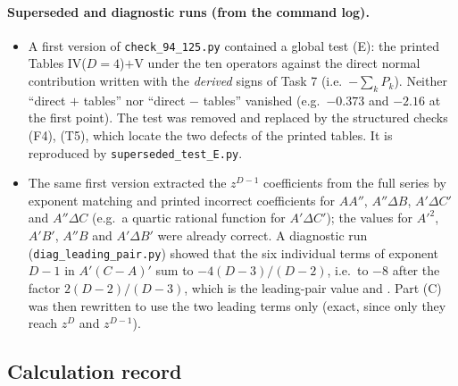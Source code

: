 \paragraph{Superseded and diagnostic runs (from the command log).}
\begin{itemize}[leftmargin=14pt]
\item A first version of \texttt{check\_94\_125.py} contained a global test (E): the printed Tables IV($D=4$)$+$V under the ten operators against the
direct normal contribution written with the \emph{derived} signs of Task 7 (i.e.\ $-\sum_kP_k$). Neither ``direct $+$ tables'' nor
``direct $-$ tables'' vanished (e.g.\ $-0.373$ and $-2.16$ at the first point). The test was removed and replaced by the structured checks (F4), (T5),
which locate the two defects of the printed tables. It is reproduced by \texttt{superseded\_test\_E.py}.
\item The same first version extracted the $z^{D-1}$ coefficients from the full series by exponent matching and printed incorrect coefficients for
$AA''$, $A''\Delta B$, $A'\Delta C'$ and $A''\Delta C$ (e.g.\ a quartic rational function for $A'\Delta C'$); the values for $A'^2$, $A'B'$,
$A''B$ and $A'\Delta B'$ were already correct. A diagnostic run (\texttt{diag\_leading\_pair.py}) showed that the six
individual terms of exponent $D-1$ in $A'(C-A)'$ sum to $-4(D-3)/(D-2)$, i.e.\ to $-8$ after the factor $2(D-2)/(D-3)$, which is the leading-pair value
and . Part (C) was then rewritten to use the two leading terms only (exact, since only they reach $z^D$ and $z^{D-1}$).
\end{itemize}

\subsection{Calculation record}

